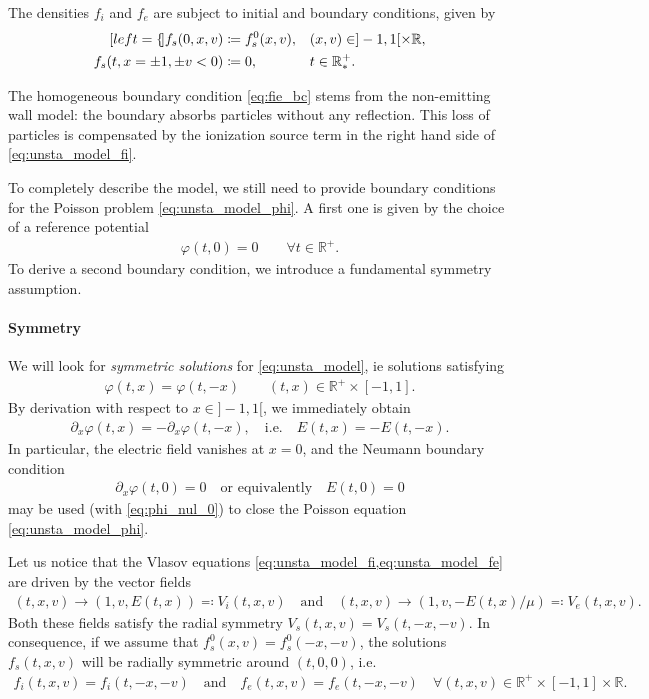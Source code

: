 \documentclass{article}
\numberwithin{equation}{section}
\newcommand{\R}{\mathbb{R}}
\newcommand{\mysubeq}[2]{ %
	\begin{subequations}\label{#1}
		\begin{align}[left = {\empheqlbrace}]
			#2
		\end{align}
	\end{subequations}	
}
\begin{document}
The densities $f_i$ and $f_e$ are subject to initial and boundary conditions, given by
\mysubeq{eq:unsta_model_bc}{
	f_{s}(0,x,v) &\coloneqq f_{s}^0(x,v), && (x,v) \in ]-1,1[ \times \R, \label{eq:init} \\
	f_{s}(t,x=\pm 1,\pm v < 0) &\coloneqq 0,  && t \in \R^+_*. \label{eq:fie_bc}
}
The homogeneous boundary condition \cref{eq:fie_bc} stems from the non-emitting wall model: the boundary absorbs particles without any reflection. This loss of particles is compensated by the ionization source term in the right hand side of \eqref{eq:unsta_model_fi}. 

To completely describe the model, we still need to provide boundary conditions for the Poisson problem \cref{eq:unsta_model_phi}. A first one is given by the choice of a reference potential
\begin{align}
	\varphi(t,0) = 0 \quad \quad \forall t \in \R^+. \label{eq:phi_nul_0}
\end{align}
To derive a second boundary condition, we introduce a fundamental symmetry assumption.

\paragraph{Symmetry}

We will look for \emph{symmetric solutions} for \ref{eq:unsta_model}, ie solutions satisfying 
\begin{align}\label{eq:phi_is_pair}
	\varphi(t,x) = \varphi (t,-x) \quad \quad (t,x) \in \R^+ \times [-1,1].
\end{align}
By derivation with respect to $x \in ]-1,1[$, we immediately obtain 
\begin{align*}
	\partial_x \varphi(t,x) = - \partial_x \varphi (t,-x), \quad \text{i.e.} \quad E(t,x) = - E(t,-x).
\end{align*}
In particular, the electric field vanishes at $x=0$, and the Neumann boundary condition
\begin{align}\label{eq:phi_bc_neumann}
	\partial_x \varphi (t,0) = 0 \quad \text{or equivalently} \quad E(t,0) = 0
\end{align}
may be used (with \cref{eq:phi_nul_0}) to close the Poisson equation \cref{eq:unsta_model_phi}.


Let us notice that the Vlasov equations \cref{eq:unsta_model_fi,eq:unsta_model_fe} are driven by the vector fields
\begin{align*}
	(t,x,v) \to (1, v, E(t,x)) \eqqcolon V_i(t,x,v) \quad \text{and} \quad (t,x,v) \to (1, v, -E(t,x)/\mu) \eqqcolon V_e(t,x,v).
\end{align*}
 Both these fields satisfy the radial symmetry $V_s(t,x,v) = V_s(t,-x,-v)$. In consequence, if we assume that $f_s^0(x,v)=f_s^0(-x,-v)$, the solutions $f_s(t,x,v)$ will be radially symmetric around $(t,0,0)$, i.e. 
 \begin{align*}
 	f_i(t,x,v) = f_i(t,-x,-v) \quad \text{and} \quad f_e(t,x,v) = f_e(t,-x,-v) \quad \forall (t,x,v) \in \R^+ \times [-1,1] \times \mathbb{R}.
 \end{align*}
\end{document}
